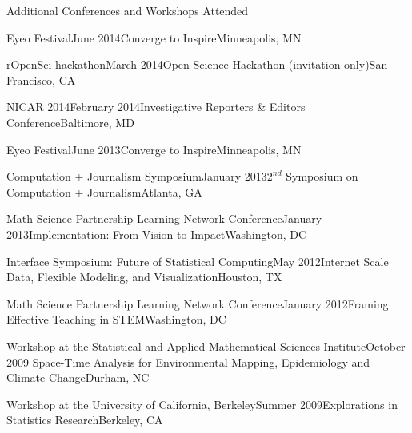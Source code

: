\documentclass{resume} %
\begin{document}
\clearpage
\begin{rSection}{Additional Conferences and Workshops Attended}
\begin{sSubsection}{Eyeo Festival}{}{June 2014}{Converge to Inspire}{Minneapolis, MN}
\end{sSubsection}

\begin{sSubsection}{rOpenSci hackathon}{}{March 2014}{Open Science Hackathon (invitation only)}{San Francisco, CA}
\end{sSubsection}

\begin{sSubsection}{NICAR 2014}{}{February 2014}{Investigative Reporters \& Editors Conference}{Baltimore, MD}
\end{sSubsection}

\begin{sSubsection}{Eyeo Festival}{}{June 2013}{Converge to Inspire}{Minneapolis, MN}
\end{sSubsection}

\begin{sSubsection}{Computation + Journalism Symposium}{}{January 2013}{$2^{nd}$ Symposium on Computation + Journalism}{Atlanta, GA}
\end{sSubsection}

\begin{sSubsection}{Math Science Partnership Learning Network Conference}{}{January 2013}{Implementation: From Vision to Impact}{Washington, DC}
\end{sSubsection}

\begin{sSubsection}{Interface Symposium: Future of Statistical Computing}{}{May 2012}{Internet Scale Data, Flexible Modeling, and Visualization}{Houston, TX}
\end{sSubsection}

\begin{sSubsection}{Math Science Partnership Learning Network Conference}{}{January 2012}{Framing Effective Teaching in STEM}{Washington, DC}
\end{sSubsection}

\begin{sSubsection}{Workshop at the Statistical and Applied Mathematical Sciences Institute}{}{October 2009}{ Space-Time Analysis for Environmental Mapping, Epidemiology and Climate Change}{Durham, NC}
\end{sSubsection}

\begin{sSubsection}{Workshop at the University of California, Berkeley}{}{Summer 2009}{Explorations in Statistics Research}{Berkeley, CA}
\end{sSubsection}
\end{rSection}
\end{document}
